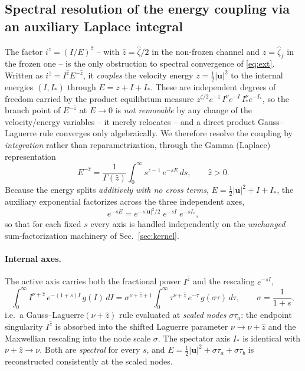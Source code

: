 \documentclass[11pt]{article}
\newcommand{\uu}{\mathbf{u}}
\newcommand{\zetah}{\hat{\zeta}}
\begin{document}
\subsection{Spectral resolution of the energy coupling via an auxiliary Laplace integral}
\label{sec:laplace}
The factor $i^{\hat z}=(I/E)^{\hat z}$ -- with $\hat z=\zetah/2$ in the non-frozen channel and
$\hat z=\zetah_f$ in the frozen one -- is the only obstruction to spectral convergence of
\eqref{eq:ext}. Written as $i^{\hat z}=I^{\hat z}E^{-\hat z}$, it \emph{couples} the velocity
energy $z=\tfrac12|\uu|^2$ to the internal energies $(I,I_*)$ through $E=z+I+I_*$. These are
independent degrees of freedom carried by the product equilibrium measure
$z^{\zeta/2}e^{-z}\,I^\nu e^{-I}\,I_*^\nu e^{-I_*}$, so the branch point of $E^{-\hat z}$ at
$E\to0$ is \emph{not removable} by any change of the velocity/energy variables -- it merely
relocates -- and a direct product Gauss--Laguerre rule converges only algebraically. We therefore
resolve the coupling by \emph{integration} rather than reparametrization, through the Gamma
(Laplace) representation
\begin{equation}
E^{-\hat z}=\frac{1}{\Gamma(\hat z)}\int_0^\infty s^{\hat z-1}\,e^{-sE}\,ds ,\qquad \hat z>0 .
\label{eq:laplace}
\end{equation}
Because the energy splits \emph{additively with no cross terms}, $E=\tfrac12|\uu|^2+I+I_*$, the
auxiliary exponential factorizes across the three independent axes,
\begin{equation}
e^{-sE}=e^{-s|\uu|^2/2}\;e^{-sI}\;e^{-sI_*},
\label{eq:factorize}
\end{equation}
so that for each fixed $s$ every axis is handled independently on the \emph{unchanged}
sum-factorization machinery of Sec.~\ref{sec:kernel}.

\paragraph{Internal axes.}
The active axis carries both the fractional power $I^{\hat z}$ and the rescaling $e^{-sI}$,
\begin{equation}
\int_0^\infty I^{\nu+\hat z}\,e^{-(1+s)I}\,g(I)\,dI
=\sigma^{\nu+\hat z+1}\!\int_0^\infty \tau^{\nu+\hat z}\,e^{-\tau}\,g(\sigma\tau)\,d\tau,
\qquad \sigma=\frac{1}{1+s},
\label{eq:rescale}
\end{equation}
i.e.\ a Gauss--Laguerre$(\nu+\hat z)$ rule evaluated at \emph{scaled nodes} $\sigma\tau_a$: the
endpoint singularity $I^{\hat z}$ is absorbed into the shifted Laguerre parameter
$\nu\!\to\!\nu+\hat z$ and the Maxwellian rescaling into the node scale $\sigma$. The spectator
axis $I_*$ is identical with $\nu+\hat z\!\to\!\nu$. Both are \emph{spectral} for every $s$, and
$E=\tfrac12|\uu|^2+\sigma\tau_a+\sigma\tau_b$ is reconstructed consistently at the scaled nodes.
\end{document}
